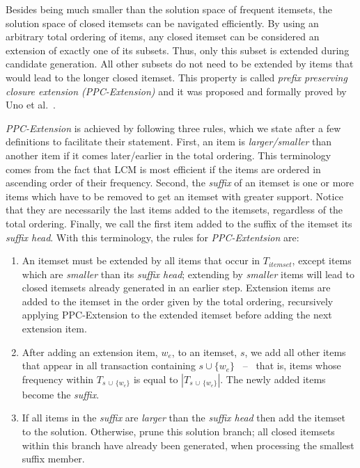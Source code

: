 \documentclass[letterpaper,12pt,titlepage,oneside,final]{book}
\begin{document}
Besides being much smaller than the solution space of frequent itemsets,
the solution space of closed itemsets can be navigated efficiently.
By using an arbitrary total ordering of items, any closed itemset can be
considered an extension of exactly one of its subsets.
Thus, only this subset is extended during candidate generation.
All other subsets do not need to be extended by items that would lead to
the longer closed itemset.
This property is called \emph{prefix preserving closure extension
(PPC-Extension)} and it was proposed and formally proved by
Uno et al.~\cite{uno2004lcm}.


\emph{PPC-Extension} is achieved by following three rules, which we state
after a few definitions to facilitate their statement.
First, an item is \emph{larger/smaller} than another item if it comes
later/earlier in the total ordering.
This terminology comes from the fact that LCM is most efficient if the items
are ordered in ascending order of their frequency.
Second, the \emph{suffix} of an itemset is one or more items 
which have to be removed to get
an itemset with greater support.
Notice that they are necessarily 
the last items added to the itemsets,
regardless of the total ordering.
Finally, we call the first item added to the suffix of the itemset its
\emph{suffix head}.
With this terminology, the rules for \emph{PPC-Extentsion} are:
\begin{enumerate}
\item An itemset must be extended by all items that occur in $T_{itemset}$, 
except items which are \emph{smaller} than its \emph{suffix head};
extending by \emph{smaller} items will lead to closed itemsets already generated in an earlier step. 
Extension items are added to the itemset in the order given by the total ordering,
recursively applying PPC-Extension to the extended itemset before adding the next extension item.
\item After adding an extension item, $w_e$, to an itemset, $s$, we add all other items that appear in all transaction containing $s \cup \{w_e\}$ ~--~ 
that is, items whose frequency within  $T_{s\, \cup \, \{w_e\}}$ is equal to $|T_{s \, \cup \, \{w_e\}}|$.
The newly added items become the \emph{suffix}.
\item If all items in the \emph{suffix} are \emph{larger} than the \emph{suffix head} then add the itemset to the solution. Otherwise, prune this solution branch; all closed itemsets within this branch have already been generated, when processing the smallest suffix member.
\end{enumerate}
 
\end{document}
